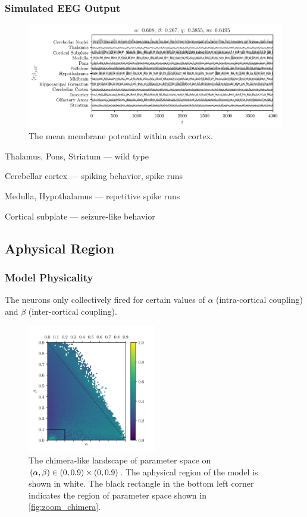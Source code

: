 \documentclass[hyperref={hidelinks}]{beamer}
\newcommand*{\hra}{\alpha}
\newcommand*{\hrb}{\beta}
\begin{document}
\begin{frame}
  \frametitle{Simulated EEG Output}
  \begin{figure}[ht]
    \centering
    \includegraphics[width=\textwidth]{figure/means-0_608-0_267}
    \caption[Mean potential by cortex]{The mean membrane potential within each cortex.
    }
    \label{fig:mean_608_267}
  \end{figure}
  Thalamus, Pons, Striatum --- wild type

  Cerebellar cortex --- spiking behavior, spike runs

  Medulla, Hypothalamus --- repetitive spike runs

  Cortical subplate --- seizure-like behavior

\end{frame}

\subsection{Aphysical Region}
\begin{frame}
  \frametitle{Model Physicality}
  The neurons only collectively fired for certain values of $\hra$ (intra-cortical coupling) and $\hrb$ (inter-cortical coupling).
  \begin{figure}[ht]
    \centering
    \includegraphics[width=0.5\textwidth]{figure/aphysical_chimera}
    \caption[Chimera-like index landscape]{
      The chimera-like landscape of parameter space on $\pqty{\hra, \hrb} \in \pqty{0, 0.9} \times \pqty{0, 0.9}$.
      The aphysical region of the model is shown in white.
      The black rectangle in the bottom left corner indicates the region of parameter space shown in \cref{fig:zoom_chimera}.
    }
    \label{fig:aphysical_chimera}
  \end{figure}

\end{frame}
\end{document}
